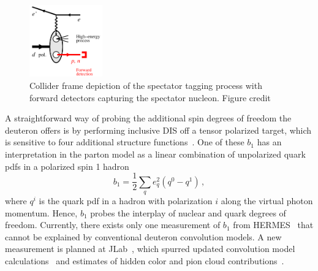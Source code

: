     \begin{figure}
        \includegraphics[width=0.28\textwidth]{plots/deut_tag_collider}
        \caption{Collider frame depiction of the spectator tagging process with forward detectors capturing the spectator nucleon. Figure credit~\cite{deutLDRD}}
        \label{fig:collider}
    \end{figure}

A straightforward way of probing the additional spin degrees of freedom the deuteron offers is by performing inclusive DIS off a tensor polarized target, which is sensitive to four additional structure functions~\cite{Hoodbhoy:1988am}.  One of these $b_1$ has an interpretation in the parton model as a linear combination of unpolarized quark pdfs in a polarized spin 1 hadron
\begin{equation}
b_1=\frac{1}{2}\sum_q e_q^2(q^0-q^1)\,,
\end{equation}
where $q^i$ is the quark pdf in a hadron with polarization $i$ along the virtual photon momentum.  Hence, $b_1$ probes the interplay of nuclear and quark degrees of freedom.  Currently, there exists only one measurement of $b_1$ from HERMES~\cite{Airapetian:2005cb} that cannot be explained by conventional deuteron convolution models.  A new measurement is planned at JLab~\cite{Slifer:2013vma}, which spurred updated convolution model calculations~\cite{Cosyn:2017fbo} and estimates of hidden color and pion cloud contributions~\cite{Miller:2013hla}.

